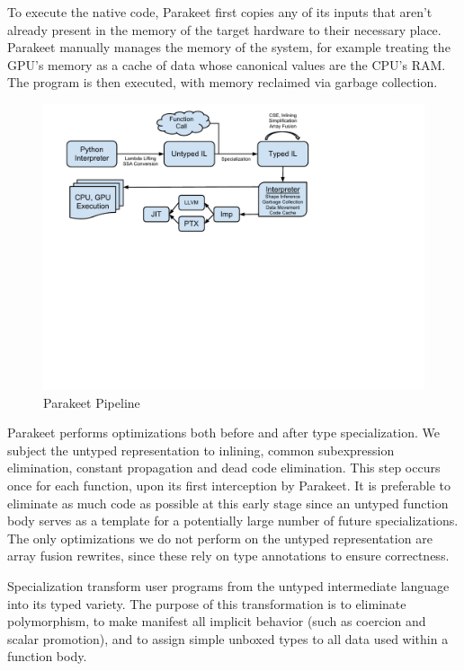 \documentclass[10pt,twocolumn]{article}
\begin{document}
To execute the native code, Parakeet first copies any of its inputs that aren't already present in the memory of the target hardware to their necessary place.  Parakeet manually manages the memory of the system, for example treating the GPU's memory as a cache of data whose canonical values are the CPU's RAM. The program is then executed, with memory reclaimed via garbage collection.

\begin{figure}[t!bh]
\begin{center}
\leavevmode
\includegraphics[scale=0.6, trim=0pt 310pt 140pt 80pt]{ParakeetNumPyOverview.pdf}
\end{center}
\caption{Parakeet Pipeline}
\label{fig:overview}
\end{figure}

Parakeet performs optimizations both before and after type specialization. We subject the untyped representation to inlining, common subexpression elimination, constant propagation and dead code elimination. This step occurs once for each function, upon its first interception by Parakeet. It is preferable to eliminate as much code as possible at this early stage since an untyped function body serves as a template for a potentially large number of future specializations. The only optimizations we do not perform on the untyped representation are array fusion rewrites, since these rely on type annotations to ensure correctness.

Specialization transform user programs from the untyped intermediate language into its typed variety. The purpose of this transformation is to eliminate polymorphism, to make manifest all implicit behavior (such as coercion and scalar promotion), and to assign simple unboxed types to all data used within a function body. 
\end{document}
